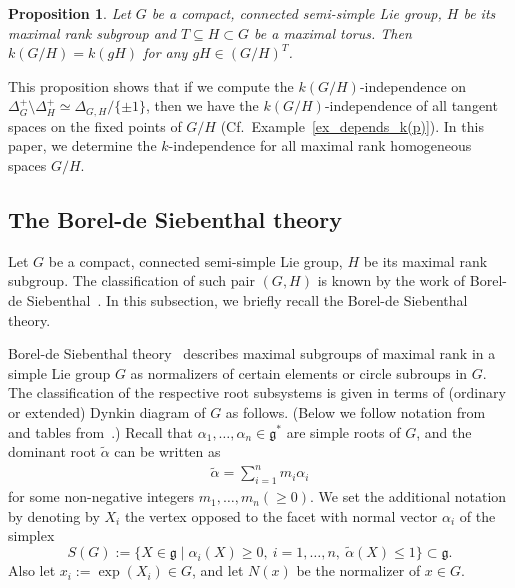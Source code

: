 \documentclass{amsart}
\newtheorem{proposition}[theorem]{Proposition}
\theoremstyle{definition}
\theoremstyle{remark}
\numberwithin{equation}{section}
\newcommand{\lb}{\lbrace}
\newcommand{\rb}{\rbrace}
\begin{document}
\begin{proposition}
\label{k-independence}
Let $G$ be a compact, connected semi-simple Lie group, $H$ be its maximal rank subgroup and $T\subseteq H\subset G$ be a maximal torus. 
Then $k(G/H)=k(gH)$ for any $gH\in (G/H)^{T}$.
\end{proposition}
This proposition shows that if we compute the $k(G/H)$-independence on $\Delta_{G}^{+}\setminus \Delta_{H}^{+}\simeq \Delta_{G,H}/\{\pm 1\}$, then we have the $k(G/H)$-independence of all tangent spaces on the fixed points of $G/H$
(Cf.~Example~\ref{ex_depends_k(p)}).
In this paper, we determine the $k$-independence for all maximal rank homogeneous spaces $G/H$.

\subsection{The Borel-de Siebenthal theory}
\label{sect:2.4}

Let $G$ be a compact, connected semi-simple Lie group, $H$ be its maximal rank subgroup.
The classification of such pair $(G, H)$ is known by the work of Borel-de Siebenthal~\cite{BoSi}. 
In this subsection, we briefly recall the Borel-de Siebenthal theory.

Borel-de Siebenthal theory~\cite{BoSi} describes maximal subgroups of maximal rank in a simple Lie group $G$ as normalizers of certain elements or circle subroups in $G$.
The classification of the respective root subsystems is given in terms of (ordinary or extended) Dynkin diagram of $G$ as follows.
(Below we follow notation from~\cite{MiTo} and tables from~\cite{Y25}.)
Recall that $\alpha_{1},\dots,\alpha_{n}\in\mathfrak{g}^{*}$ are simple roots of $G$, and the dominant root $\widetilde{\alpha}$ can be written as
\begin{align}
\label{dominant root}
\widetilde{\alpha}=\sum_{i=1}^{n} m_{i}\alpha_{i}
\end{align}
for some non-negative integers $m_{1},\ldots, m_{n}(\ge 0)$.
We set the additional notation by denoting by $X_{i}$ the vertex opposed to the facet with normal vector $\alpha_{i}$ of the simplex 
\[
S(G):=\lb X\in \mathfrak{g}\mid \alpha_{i}(X)\geq 0,\ i=1,\dots,n,\ \widetilde{\alpha}(X)\leq 1\rb\subset \mathfrak{g}.
\]
Also let $x_{i}:=\exp(X_{i})\in G$, and let $N(x)$ be the normalizer of $x\in G$.
\end{document}
